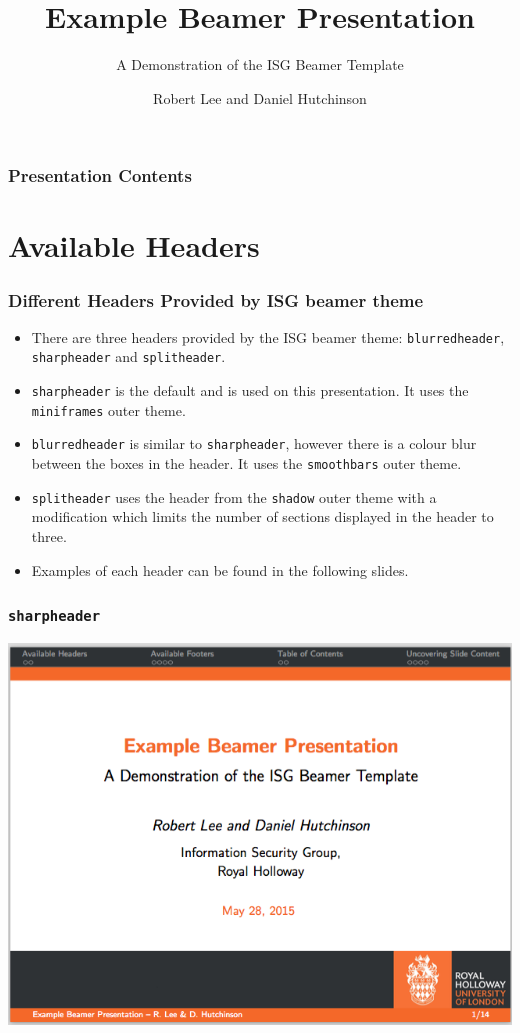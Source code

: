 \documentclass[]{beamer}
\title{Example Beamer Presentation}
\subtitle{A Demonstration of the ISG Beamer Template}
\author[R. Lee \& D. Hutchinson]{Robert Lee and Daniel Hutchinson}
\institute{Information Security Group,\\
Royal Holloway}
\begin{document}
\begin{frame}
	\titlepage
\end{frame}

\begin{frame}\frametitle{Presentation Contents}
	\tableofcontents
\end{frame}

\section{Available Headers}
\begin{frame}\frametitle{Different Headers Provided by ISG beamer theme}
\begin{itemize}
	\item There are three headers provided by the ISG beamer theme: \texttt{blurredheader}, \texttt{sharpheader} and \texttt{splitheader}.
	\item \texttt{sharpheader} is the default and is used on this presentation. It uses the \texttt{miniframes} outer theme.
	\item \texttt{blurredheader} is similar to \texttt{sharpheader}, however there is a colour blur between the boxes in the header.  It uses the \texttt{smoothbars} outer theme.
	\item \texttt{splitheader} uses the header from the \texttt{shadow} outer theme with a modification which limits the number of sections displayed in the header to three.
	\item Examples of each header can be found in the following slides.
\end{itemize}
\end{frame}

\begin{frame}\frametitle{\texttt{sharpheader}}
\begin{center}
	\includegraphics[scale=0.4]{graphics/sharpheader.png}
\end{center}
\end{frame}
\end{document}
